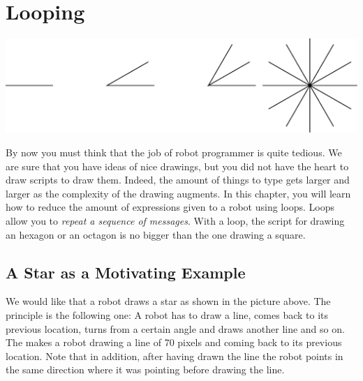 \ifx\wholebook\relax\else



\fi


\chapter{Looping}\label{ch:looping}\label{cha:loops}

\begin{chapterfigure}
\includegraphics[width=0.9\linewidth]{loopTitlePicture}
\end{chapterfigure}



By now you must think that the job of robot programmer is quite
tedious. We are sure that you have ideas of nice drawings, but you did not have the heart to draw scripts to draw them.  Indeed, the amount of things to type gets larger and larger as the complexity of the drawing augments. In this chapter, you will learn how to reduce the amount of expressions given to a robot using loops. Loops allow you to \emph{repeat a sequence of messages}. With a loop, the script for drawing an hexagon or an octagon is no bigger than the one drawing a square.

\section{A Star as a Motivating Example}
We would like that a robot draws a star as shown in the picture above. The principle is the following one: A robot has to draw a line, comes back to its previous location, turns from a certain angle and draws another line and so on. The  makes a robot drawing a line of 70 pixels
and coming back to its previous location. Note that in addition, after having drawn the line the robot points in the same direction where it was pointing before drawing the line.

